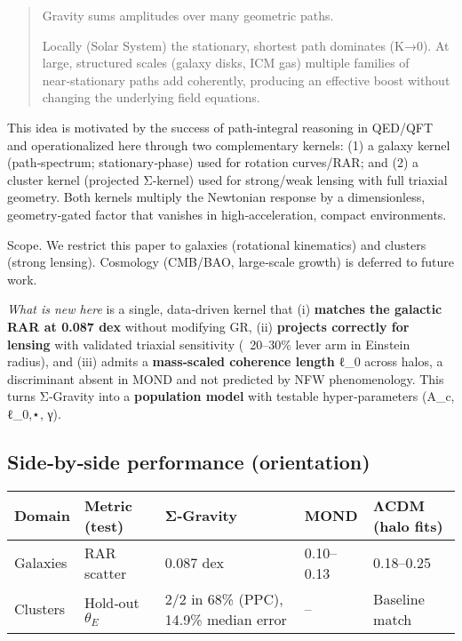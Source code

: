 \documentclass[11pt,a4paper]{article}
\begin{document}
\begin{quote}
Gravity sums amplitudes over many geometric paths.

Locally (Solar System) the stationary, shortest path dominates (K→0). At large, structured scales (galaxy disks, ICM gas) multiple families of near‑stationary paths add coherently, producing an effective boost without changing the underlying field equations.

\end{quote}


This idea is motivated by the success of path‑integral reasoning in QED/QFT and operationalized here through two complementary kernels: (1) a galaxy kernel (path‑spectrum; stationary‑phase) used for rotation curves/RAR; and (2) a cluster kernel (projected Σ‑kernel) used for strong/weak lensing with full triaxial geometry. Both kernels multiply the Newtonian response by a dimensionless, geometry‑gated factor that vanishes in high‑acceleration, compact environments.


Scope. We restrict this paper to galaxies (rotational kinematics) and clusters (strong lensing). Cosmology (CMB/BAO, large‑scale growth) is deferred to future work.


\textit{What is new here} is a single, data‑driven kernel that (i) \textbf{matches the galactic RAR at 0.087 dex} without modifying GR, (ii) \textbf{projects correctly for lensing} with validated triaxial sensitivity (~20–30\% lever arm in Einstein radius), and (iii) admits a \textbf{mass‑scaled coherence length} ℓ\_0 across halos, a discriminant absent in MOND and not predicted by NFW phenomenology. This turns Σ‑Gravity into a \textbf{population model} with testable hyper‑parameters (A\_c, ℓ\_{0,⋆}, γ).

\subsection{Side‑by‑side performance (orientation)}


\begin{table}[h]
\centering
\begin{tabular}{lllll}
\toprule
Domain & Metric (test) & Σ‑Gravity & MOND & ΛCDM (halo fits) \\
\midrule
Galaxies & RAR scatter & 0.087 dex & 0.10–0.13 & 0.18–0.25 \\
Clusters & Hold‑out $\theta_E$ & 2/2 in 68\% (PPC), 14.9\% median error & – & Baseline match \\
\bottomrule
\end{tabular}
\end{table}
\end{document}
